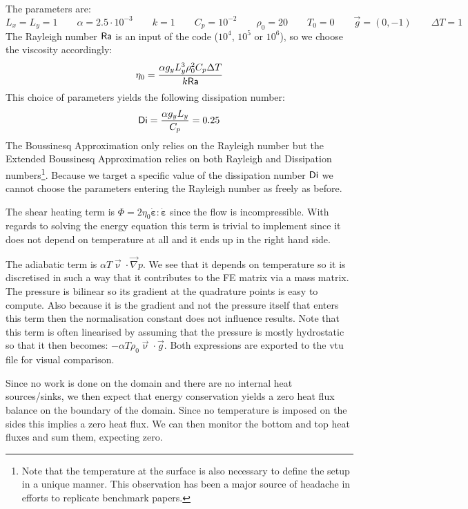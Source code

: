 The parameters are:
\[
L_x=L_y=1
\qquad
\alpha=2.5\cdot 10^{-3}
\qquad
k=1
\qquad
C_p=10^{-2}
\qquad
\rho_0=20
\qquad
T_0=0
\qquad
\vec{g}=(0,-1)
\qquad
\Delta T = 1
\]
The Rayleigh number ${\mathsf{Ra}}$ is an input of the code ($10^4$, $10^5$ or $10^6$), so 
we choose the viscosity accordingly:
\[
\eta_0 = \frac{\alpha g_y L_y^3 \rho_0^2 C_p \Delta T}{k {\mathsf{Ra}}}
\]
This choice of parameters yields the following dissipation number:
\[
{\mathsf{Di}}=\frac{\alpha g_y L_y}{C_p} = 0.25
\]
The Boussinesq Approximation only relies on the Rayleigh number but the 
Extended Boussinesq Approximation relies on both Rayleigh and Dissipation numbers\footnote{Note that 
the temperature at the surface is also necessary to define the setup in a unique manner. This observation
has been a major source of headache in efforts to replicate benchmark papers.}. 
Because we target a specific value of the dissipation number ${\mathsf{Di}}$ we cannot choose the 
parameters entering the Rayleigh number as freely as before.

The shear heating term is $\Phi=2 \eta_0 \dot{\bm \varepsilon}:\dot{\bm \varepsilon}$ since the flow
is incompressible. With regards to solving the energy equation this term is trivial to implement 
since it does not depend on temperature at all and it ends up in the right hand side.

The adiabatic term is $\alpha T \vec{\upnu}\cdot\vec\nabla p$. 
We see that it depends on temperature so it is discretised in such a 
way that it contributes to the FE matrix via a mass matrix. 
The pressure is bilinear so its gradient at the quadrature points is easy to compute.  
Also because it is the gradient and not the pressure itself that enters this term then 
the normalisation constant does not influence results.
Note that this term is often linearised by assuming that the pressure is mostly hydrostatic
so that it then becomes: $- \alpha T \rho_0 \vec\upnu\cdot\vec{g}$.
Both expressions are exported to the vtu file for visual comparison.

Since no work is done on the domain and there are no internal heat sources/sinks, we then 
expect that energy conservation yields a zero heat flux balance on the boundary of the domain. 
Since no temperature is imposed on the sides this implies a zero heat flux. 
We can then monitor the bottom and top heat fluxes and sum them, expecting zero.  

